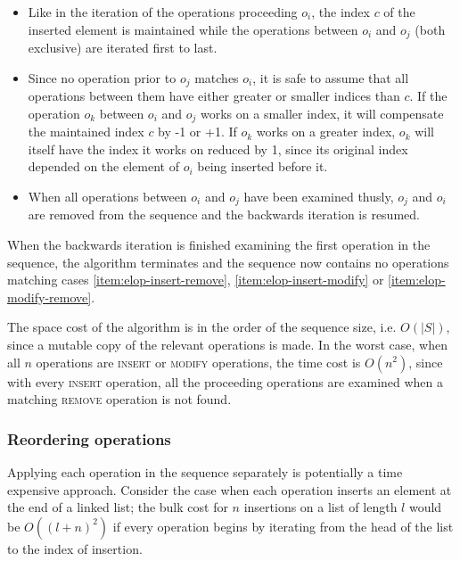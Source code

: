 \begin{itemize}

  \item Like in the iteration of the operations proceeding $o_i$, the index $c$
  of the inserted element is maintained while the operations between $o_i$ and
  $o_j$ (both exclusive) are iterated first to last.

  \item Since no operation prior to $o_j$ matches $o_i$, it is safe to assume
  that all operations between them have either greater or smaller indices than
  $c$. If the operation $o_k$ between $o_i$ and $o_j$ works on a smaller index,
  it will compensate the maintained index $c$ by -1 or +1. If $o_k$ works on a
  greater index, $o_k$ will itself have the index it works on reduced by 1,
  since its original index depended on the element of $o_i$ being inserted
  before it.
  
  \item When all operations between $o_i$ and $o_j$ have been examined thusly,
  $o_j$ and $o_i$ are removed from the sequence and the backwards iteration is
  resumed.
  
\end{itemize}

When the backwards iteration is finished examining the first operation in the
sequence, the algorithm terminates and the sequence now contains no operations
matching cases \ref{item:elop-insert-remove}, \ref{item:elop-insert-modify} or
\ref{item:elop-modify-remove}.

The space cost of the algorithm is in the order of the sequence size, i.e.
$O(\left|S\right|)$, since a mutable copy of the relevant operations is made.
In the worst case, when all $n$ operations are \textsc{insert} or
\textsc{modify} operations, the time cost is $O\left(n^2\right)$, since with
every \textsc{insert} operation, all the proceeding operations are examined when
a matching \textsc{remove} operation is not found.

\subsubsection{Reordering operations}

Applying each operation in the sequence separately is potentially a time
expensive approach. Consider the case when each operation inserts an element at
the end of a linked list; the bulk cost for $n$ insertions on a list of length
$l$ would be $O\left(\left(l+n\right)^2\right)$ if every operation begins by
iterating from the head of the list to the index of insertion.

